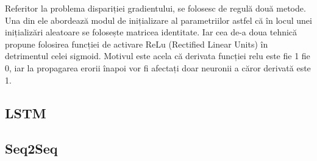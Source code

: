Referitor la problema dispariției gradientului, se folosesc de regulă două metode. Una din ele abordează modul de inițializare al parametriilor astfel că în locul unei inițializări aleatoare se folosește matricea identitate. Iar cea de-a doua tehnică propune folosirea funcției de activare ReLu (Rectified Linear Units) în detrimentul celei sigmoid. Motivul este acela că derivata funcției relu este fie 1 fie 0, iar la propagarea erorii înapoi vor fi afectați doar neuronii a căror derivată este 1.

\subsection{LSTM}



\subsection{Seq2Seq}